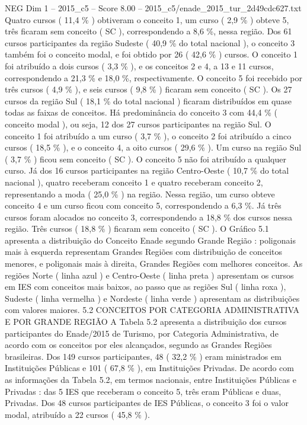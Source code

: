 \begin{textsample}{NEG Dim 1 – 2015\_c5 – Score 8.00 – 2015\_c5/enade\_2015\_tur\_2d49cdc627.txt}
Quatro cursos ( 11,4 \% ) obtiveram o conceito 1, um curso ( 2,9 \% ) obteve 5, três ficaram sem conceito ( SC ), correspondendo a 8,6 \%, nessa região.
Dos 61 cursos participantes da região Sudeste ( 40,9 \% do total nacional ), o conceito 3 também foi o conceito modal, e foi obtido por 26 ( 42,6 \% ) cursos.
O conceito 1 foi atribuído a dois cursos ( 3,3 \% ), e os conceitos 2 e 4, a 13 e 11 cursos, correspondendo a 21,3 \% e 18,0 \%, respectivamente.
O conceito 5 foi recebido por três cursos ( 4,9 \% ), e seis cursos ( 9,8 \% ) ficaram sem conceito ( SC ).
Os 27 cursos da região Sul ( 18,1 \% do total nacional ) ficaram distribuídos em quase todas as faixas de conceitos.
Há predominância do conceito 3 com 44,4 \% ( conceito modal ), ou seja, 12 dos 27 cursos participantes na região Sul.
O conceito 1 foi atribuído a um curso ( 3,7 \% ), o conceito 2 foi atribuído a cinco cursos ( 18,5 \% ), e o conceito 4, a oito cursos ( 29,6 \% ).
Um curso na região Sul ( 3,7 \% ) ficou sem conceito ( SC ).
O conceito 5 não foi atribuído a qualquer curso.
Já dos 16 cursos participantes na região Centro-Oeste ( 10,7 \% do total nacional ), quatro receberam conceito 1 e quatro receberam conceito 2, representando a moda ( 25,0 \% ) na região.
Nessa região, um curso obteve conceito 4 e um curso ficou com conceito 5, correspondendo a 6,3 \%.
Já três cursos foram alocados no conceito 3, correspondendo a 18,8 \% dos cursos nessa região.
Três cursos ( 18,8 \% ) ficaram sem conceito ( SC ).
O Gráfico 5.1 apresenta a distribuição do Conceito Enade segundo Grande Região : poligonais mais à esquerda representam Grandes Regiões com distribuição de conceitos menores, e poligonais mais à direita, Grandes Regiões com melhores conceitos.
As regiões Norte ( linha azul ) e Centro-Oeste ( linha preta ) apresentam os cursos em IES com conceitos mais baixos, ao passo que as regiões Sul ( linha roxa ), Sudeste ( linha vermelha ) e Nordeste ( linha verde ) apresentam as distribuições com valores maiores. 5.2 CONCEITOS POR CATEGORIA ADMINISTRATIVA E POR GRANDE REGIÃO A Tabela 5.2 apresenta a distribuição dos cursos participantes do Enade/2015 de Turismo, por Categoria Administrativa, de acordo com os conceitos por eles alcançados, segundo as Grandes Regiões brasileiras.
Dos 149 cursos participantes, 48 ( 32,2 \% ) eram ministrados em Instituições Públicas e 101 ( 67,8 \% ), em Instituições Privadas.
De acordo com as informações da Tabela 5.2, em termos nacionais, entre Instituições Públicas e Privadas : das 5 IES que receberam o conceito 5, três eram Públicas e duas, Privadas.
Dos 48 cursos participantes de IES Públicas, o conceito 3 foi o valor modal, atribuído a 22 cursos ( 45,8 \% ).

\end{textsample}

